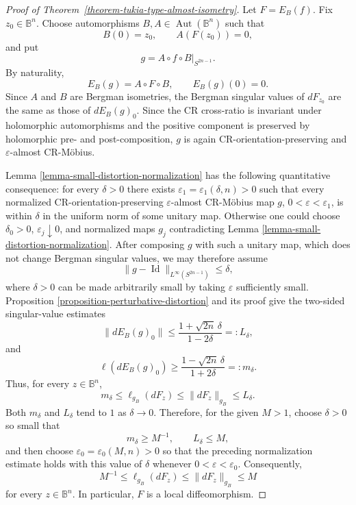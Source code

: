 \documentclass[11pt]{article}
\theoremstyle{definition}
\theoremstyle{remark}
\theoremstyle{definition}
\newcommand{\B}{\mathbb B}
\newcommand{\Aut}{\operatorname{Aut}}
\newcommand{\Id}{\operatorname{Id}}
\begin{document}
\begin{proof}[Proof of Theorem~\ref{theorem-tukia-type-almost-isometry}]

Let \(F=E_B(f)\).  Fix \(z_0\in\B^n\).  Choose automorphisms
\(B,A\in\Aut(\B^n)\) such that
\[
        B(0)=z_0,
        \qquad
        A(F(z_0))=0,
\]
and put
\[
        g=A\circ f\circ B|_{S^{2n-1}}.
\]
By naturality,
\[
        E_B(g)=A\circ F\circ B,
        \qquad
        E_B(g)(0)=0.
\]
Since \(A\) and \(B\) are Bergman isometries, the Bergman singular values of
\(dF_{z_0}\) are the same as those of \(dE_B(g)_0\).  Since the CR cross-ratio
is invariant under holomorphic automorphisms and the positive component is
preserved by holomorphic pre- and post-composition, \(g\) is again
CR-orientation-preserving and \(\varepsilon\)-almost CR-M\"obius.

Lemma \ref{lemma-small-distortion-normalization} has the following quantitative
consequence: for every \(\delta>0\) there exists
\(\varepsilon_1=\varepsilon_1(\delta,n)>0\) such that every normalized
CR-orientation-preserving \(\varepsilon\)-almost CR-M\"obius map
\(g\), \(0<\varepsilon<\varepsilon_1\), is within \(\delta\) in the uniform
norm of some unitary map.  Otherwise one could choose
\(\delta_0>0\), \(\varepsilon_j\downarrow0\), and normalized maps \(g_j\)
contradicting Lemma \ref{lemma-small-distortion-normalization}.
After composing \(g\) with such a unitary map, which does not change Bergman
singular values, we may therefore assume
\[
        \|g-\Id\|_{L^\infty(S^{2n-1})}\le \delta,
\]
where \(\delta>0\) can be made arbitrarily small by taking \(\varepsilon\)
sufficiently small.  Proposition
\ref{proposition-perturbative-distortion} and its proof give the two-sided
singular-value estimates
\[
        \|dE_B(g)_0\|
        \le
        \frac{1+\sqrt{2n}\,\delta}{1-2\delta}
        =:L_\delta,
\]
and
\[
        \ell(dE_B(g)_0)
        \ge
        \frac{1-\sqrt{2n}\,\delta}{1+2\delta}
        =:m_\delta.
\]
Thus, for every \(z\in\B^n\),
\begin{equation}\label{global-singular-value-bound}
        m_\delta
        \le
        \ell_{g_B}(dF_z)
        \le
        \|dF_z\|_{g_B}
        \le
        L_\delta.
\end{equation}
Both \(m_\delta\) and \(L_\delta\) tend to \(1\) as \(\delta\to0\).  Therefore,
for the given \(M>1\), choose \(\delta>0\) so small that
\[
        m_\delta\ge M^{-1},
        \qquad
        L_\delta\le M,
\]
and then choose \(\varepsilon_0=\varepsilon_0(M,n)>0\) so that the preceding
normalization estimate holds with this value of \(\delta\) whenever
\(0<\varepsilon<\varepsilon_0\).
Consequently,
\begin{equation}\label{pointwise-M-bound}
        M^{-1}
        \le
        \ell_{g_B}(dF_z)
        \le
        \|dF_z\|_{g_B}
        \le
        M
\end{equation}
for every \(z\in\B^n\).  In particular, \(F\) is a local diffeomorphism.


\end{proof}
\end{document}
